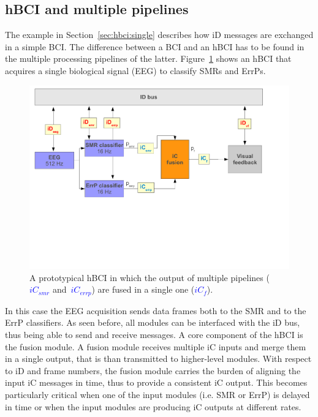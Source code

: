\documentclass[a4paper,10pt]{article}
\newcommand{\temp}[1]{\textcolor{blue}{\textbf{#1}}}
\begin{document}
\subsection{hBCI and multiple pipelines}
\label{sec:hbci:multiple}
The example in Section~\ref{sec:hbci:single} describes how iD messages are
exchanged in a simple BCI. 
The difference between a BCI and an hBCI has to be found in the multiple
processing pipelines of the latter.
Figure~\ref{fig:hbci:multiple} shows an hBCI that acquires a single biological
signal (EEG) to classify SMRs and ErrPs. 
\begin{figure}[!h]
  \begin{center}
	\includegraphics[width=\textwidth]{figures/example2.pdf}
	\caption{A prototypical hBCI in which the output of multiple pipelines 
	(\temp{$iC_{smr}$} and~\temp{$iC_{errp}$}) are fused in a single one
	(\temp{$iC_{f}$}).}
	\label{fig:hbci:multiple}
  \end{center}
\end{figure}
In this case the EEG acquisition sends data frames both to the SMR and to the
ErrP classifiers.
As seen before, all modules can be interfaced with the iD bus, thus being able
to send and receive messages.
A core component of the hBCI is the fusion module. A fusion module receives
multiple iC inputs and merge them in a single output, that is than transmitted
to higher-level modules.
With respect to iD and frame numbers, the fusion module carries the burden of
aligning the input iC messages in time, thus to provide a consistent iC output.
This becomes particularly critical when one of the input modules (i.e. SMR or
ErrP) is delayed in time or when the input modules are producing iC outputs at
different rates. 
\end{document}
